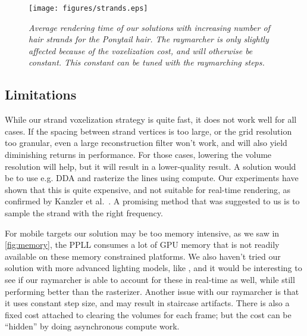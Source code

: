 \documentclass{egpubl}
\begin{document}
\begin{figure}[H]
    \texttt{[image: figures/strands.eps]}
    \vspace{-1mm}
    \caption{\emph{Average rendering time of our solutions with increasing number of hair strands for the Ponytail hair. The raymarcher is only slightly affected because of the voxelization cost, and will otherwise be constant. This constant can be tuned with the raymarching steps.}}
    \label{fig:strands}
    \vspace{-2mm}
\end{figure}

\newpage

\subsection{Limitations} \label{sec:limitations}


While our strand voxelization strategy is quite fast, it does not work well for all cases. If the spacing between strand vertices is too large, or the grid resolution too granular, even a large reconstruction filter won't work, and will also yield diminishing returns in performance. For those cases, lowering the volume resolution will help, but it will result in a lower-quality result. A solution would be to use e.g. DDA and rasterize the lines using compute. Our experiments have shown that this is quite expensive, and not suitable for real-time rendering, as confirmed by Kanzler et al.~\cite{kanzler2018voxel}. A promising method that was suggested to us is to sample the strand with the right frequency.


For mobile targets our solution may be too memory intensive, as we saw in \cref{fig:memory}, the PPLL consumes a lot of GPU memory that is not readily available on these memory constrained platforms. We also haven't tried our solution with more advanced lighting models, like \cite{nguyen2005hair}, and it would be interesting to see if our raymarcher is able to account for these in real-time as well, while still performing better than the rasterizer. Another issue with our raymarcher is that it uses constant step size, and may result in staircase artifacts. There is also a fixed cost attached to clearing the volumes for each frame; but the cost can be ``hidden'' by doing asynchronous compute work.
\end{document}
